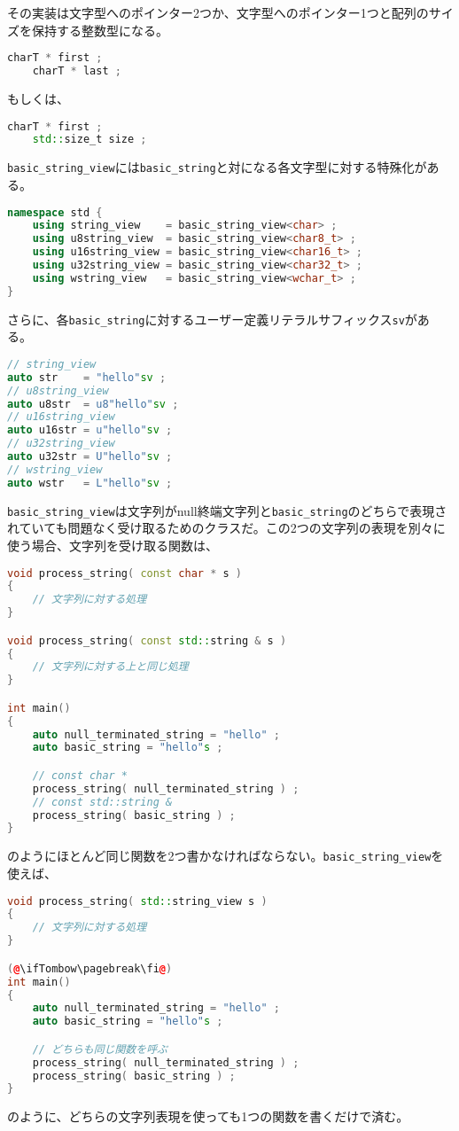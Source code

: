 その実装は文字型へのポインター2つか、文字型へのポインター1つと配列のサイズを保持する整数型になる。

\begin{lstlisting}[language={C++}]
    charT * first ;
    charT * last ;
\end{lstlisting}
もしくは、
\begin{lstlisting}[language={C++}]
    charT * first ;
    std::size_t size ;
\end{lstlisting}

\texttt{basic\_string\_view}には\texttt{basic\_string}と対になる各文字型に対する特殊化がある。

\begin{lstlisting}[language={C++}]
namespace std {
    using string_view    = basic_string_view<char> ;
    using u8string_view  = basic_string_view<char8_t> ;
    using u16string_view = basic_string_view<char16_t> ;
    using u32string_view = basic_string_view<char32_t> ;  
    using wstring_view   = basic_string_view<wchar_t> ;
}
\end{lstlisting}

\ifTombow\pagebreak\fi
さらに、各\texttt{basic\_string}に対するユーザー定義リテラルサフィックス\texttt{sv}がある。

\begin{lstlisting}[language={C++}]
// string_view
auto str    = "hello"sv ;
// u8string_view
auto u8str  = u8"hello"sv ;
// u16string_view
auto u16str = u"hello"sv ;
// u32string_view
auto u32str = U"hello"sv ;
// wstring_view
auto wstr   = L"hello"sv ;
\end{lstlisting}

\texttt{basic\_string\_view}は文字列がnull終端文字列と\texttt{basic\_string}のどちらで表現されていても問題なく受け取るためのクラスだ。この2つの文字列の表現を別々に使う場合、文字列を受け取る関数は、
\begin{lstlisting}[language={C++}]
void process_string( const char * s )
{
    // 文字列に対する処理
}

void process_string( const std::string & s )
{
    // 文字列に対する上と同じ処理
}

int main()
{
    auto null_terminated_string = "hello" ;
    auto basic_string = "hello"s ;

    // const char *
    process_string( null_terminated_string ) ;
    // const std::string &
    process_string( basic_string ) ;
}
\end{lstlisting}
のようにほとんど同じ関数を2つ書かなければならない。\texttt{basic\_string\_view}を使えば、
\begin{lstlisting}[language={C++}]
void process_string( std::string_view s )
{
    // 文字列に対する処理
}

(@\ifTombow\pagebreak\fi@)
int main()
{
    auto null_terminated_string = "hello" ;
    auto basic_string = "hello"s ;

    // どちらも同じ関数を呼ぶ
    process_string( null_terminated_string ) ;
    process_string( basic_string ) ;
}
\end{lstlisting}
のように、どちらの文字列表現を使っても1つの関数を書くだけで済む。

